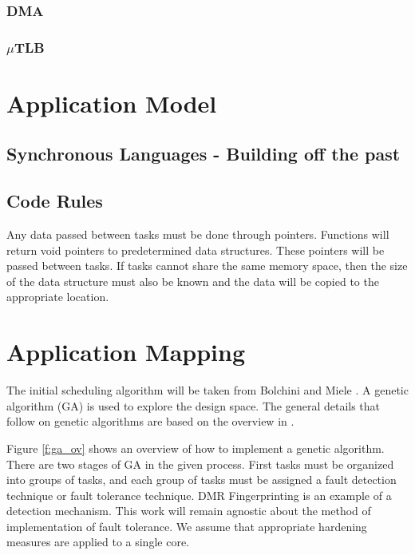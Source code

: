 \documentclass{article}
\begin{document}
\subsubsection{DMA}

\subsubsection{$\mu$TLB}

\section{Application Model}
\subsection{Synchronous Languages - Building off the past}

\subsection{Code Rules}
Any data passed between tasks must be done through pointers. Functions will return void pointers to predetermined data structures. These pointers will be passed between tasks. If tasks cannot share the same memory space, then the size of the data structure must also be known and the data will be copied to the appropriate location.



\section{Application Mapping}

The initial scheduling algorithm will be taken from Bolchini and  Miele \cite{bolchini2013reliability}. A genetic algorithm (GA) is used to explore the design space. The general details that follow on genetic algorithms are based on the overview in \cite{geatbx}.

Figure \ref{f:ga_ov} shows an overview of how to implement a genetic algorithm. There are two stages of GA in the given process. First tasks must be organized into groups of tasks, and each group of tasks must be assigned a fault detection technique or fault tolerance technique. DMR Fingerprinting is an example of a detection mechanism. This work will remain agnostic about the method of implementation of fault tolerance. We assume that appropriate hardening measures are applied to a single core.
\end{document}
